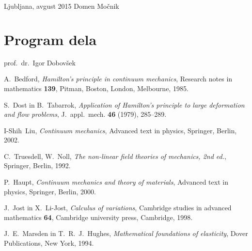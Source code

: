 \documentclass[12pt,a4paper]{report}
\begin{document}
\null

\noindent Ljubljana, avgust 2015 \hfill Domen Močnik
\pagebreak



\tableofcontents
\pagebreak



\chapter*{Program dela}


\null

\noindent prof.~dr.~Igor Dobovšek
\pagebreak




\pagebreak














\begin{thebibliography}{99}

A.~Bedford, \emph{Hamilton's principle in continuum mechanics}, Research notes in mathematics {\bf 139},
Pitman, Boston, London, Melbourne, 1985.

S.~Dost in B.~Tabarrok, \emph{Application of Hamilton's principle to large deformation and flow problems},
J.~appl.~mech. {\bf 46} (1979), 285--289.

I-Shih~Liu, \emph{Continuum mechanics}, Advanced text in physics,
Springer, Berlin, 2002.

C.~Truesdell, W.~Noll, \emph{The non-linear field theories of mechanics, 2nd ed.},
Springer, Berlin, 1992.

P.~Haupt, \emph{Continuum mechanics and theory of materials}, Advanced text in physics,
Springer, Berlin, 2000.

J.~Jost in X.~Li-Jost, \emph{Calculus of variations}, Cambridge studies in advanced mathematics {\bf 64},
Cambridge university press, Cambridge, 1998.

J.~E.~Marsden in T.~R.~J.~Hughes, \emph{Mathematical foundations of elasticity},
Dover Publications, New York, 1994.

\end{thebibliography}
\end{document}
